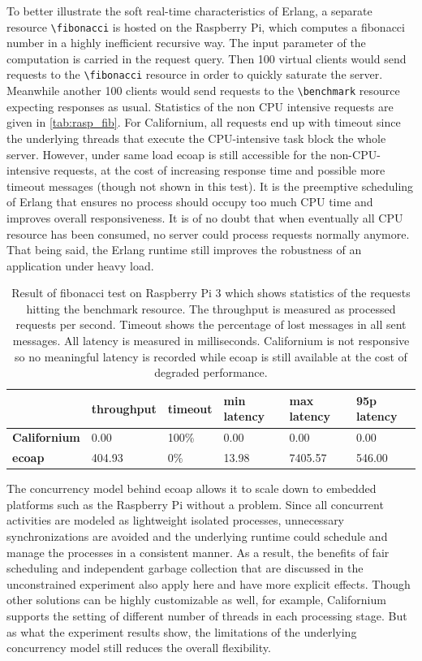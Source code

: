 To better illustrate the soft real-time characteristics of Erlang, a separate resource \verb|\fibonacci| is hosted on the Raspberry Pi, which computes a fibonacci number in a highly inefficient recursive way. The input parameter of the computation is carried in the request query. Then 100 virtual clients would send requests to the \verb|\fibonacci| resource in order to quickly saturate the server. Meanwhile another 100 clients would send requests to the \verb|\benchmark| resource expecting responses as usual. Statistics of the non CPU intensive requests are given in \autoref{tab:rasp_fib}. For Californium, all requests end up with timeout since the underlying threads that execute the CPU-intensive task block the whole server. However, under same load ecoap is still accessible for the non-CPU-intensive requests, at the cost of increasing response time and possible more timeout messages (though not shown in this test). It is the preemptive scheduling of Erlang that ensures no process should occupy too much CPU time and improves overall responsiveness. It is of no doubt that when eventually all CPU resource has been consumed, no server could process requests normally anymore. That being said, the Erlang runtime still improves the robustness of an application under heavy load.

\begin{table}[!htbp]
\centering
\begin{tabular}{llllll}
%
 & \bfseries throughput &  \bfseries timeout & \bfseries min latency & \bfseries max latency & \bfseries 95p latency \\\hline
\bfseries Californium & 0.00 & 100\% & 0.00 & 0.00 & 0.00 \\\hline
\bfseries ecoap & 404.93 & 0\% & 13.98 & 7405.57 & 546.00\\
\end{tabular}
\caption[Result of fibonacci test on Raspberry Pi 3]{Result of fibonacci test on Raspberry Pi 3 which shows statistics of the requests hitting the benchmark resource. The throughput is measured as processed requests per second. Timeout shows the percentage of lost messages in all sent messages. All latency is measured in milliseconds. Californium is not responsive so no meaningful latency is recorded while ecoap is still available at the cost of degraded performance.}
\label{tab:rasp_fib}
\end{table}

The concurrency model behind ecoap allows it to scale down to embedded platforms such as the Raspberry Pi without a problem. Since all concurrent activities are modeled as lightweight isolated processes, unnecessary synchronizations are avoided and the underlying runtime could schedule and manage the processes in a consistent manner. As a result, the benefits of fair scheduling and independent garbage collection that are discussed in the unconstrained experiment also apply here and have more explicit effects. Though other solutions can be highly customizable as well, for example, Californium supports the setting of different number of threads in each processing stage. But as what the experiment results show, the limitations of the underlying concurrency model still reduces the overall flexibility. 

